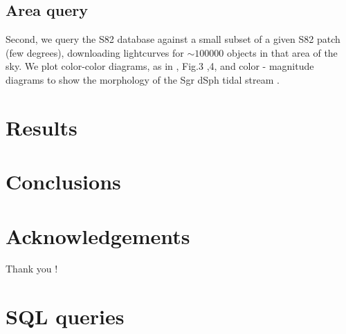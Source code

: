 \documentclass[fleqn,usenatbib]{mnras} %
\begin{document}
\subsection{Area query}

Second, we query the S82 database against a small subset of a given S82 patch (few degrees), downloading lightcurves for $\sim100 000 $ objects in that area of the sky. We plot color-color diagrams, as in \cite{sesar2007}, Fig.3 ,4, and color - magnitude diagrams to show the morphology of the Sgr dSph tidal stream \citep{sesar2010}.  




\section{Results}

\section{Conclusions}

\section*{Acknowledgements}
Thank you ! 








\onecolumn
\appendix

\section{SQL queries}
\end{document}
